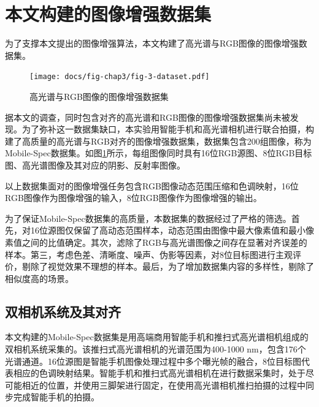 \documentclass[
    type = master, %
    degree = academic,        %
    decl-page,  %
  ]{njuthesis}
\begin{document}
\section{本文构建的图像增强数据集}

为了支撑本文提出的图像增强算法，本文构建了高光谱与RGB图像的图像增强数据集。

\begin{figure}[h]
	\centering
	\texttt{[image: docs/fig-chap3/fig-3-dataset.pdf]}
	\caption{高光谱与RGB图像的图像增强数据集}
	\label{fig:enhance dataset}
\end{figure}
据本文的调查，同时包含对齐的高光谱和RGB图像的图像增强数据集尚未被发现。为了弥补这一数据集缺口，本实验用智能手机和高光谱相机进行联合拍摄，构建了高质量的高光谱与RGB对齐的图像增强数据集，数据集包含200组图像，称为Mobile-Spec数据集。如图\ref{fig:enhance dataset}所示，每组图像同时具有16位RGB源图、8位RGB目标图、高光谱图像及其对应的阴影、反射率图像。

以上数据集面对的图像增强任务包含RGB图像动态范围压缩和色调映射，16位RGB图像作为图像增强的输入，8位RGB图像作为图像增强的输出。


为了保证Mobile-Spec数据集的高质量，本数据集的数据经过了严格的筛选。首先，对16位源图仅保留了高动态范围样本，动态范围由图像中最大像素值和最小像素值之间的比值确定。其次，滤除了RGB与高光谱图像之间存在显著对齐误差的样本。第三，考虑色差、清晰度、噪声、伪影等因素，对8位目标图进行主观评价，剔除了视觉效果不理想的样本。最后，为了增加数据集内容的多样性，剔除了相似度高的场景。


\subsection{双相机系统及其对齐}

本文构建的Mobile-Spec数据集是用高端商用智能手机和推扫式高光谱相机组成的双相机系统采集的。该推扫式高光谱相机的光谱范围为400-1000 nm，包含176个光谱通道。16位源图是智能手机图像处理过程中多个曝光帧的融合，8位目标图代表相应的色调映射结果。智能手机和推扫式高光谱相机在进行数据采集时，处于尽可能相近的位置，并使用三脚架进行固定，在使用高光谱相机推扫拍摄的过程中同步完成智能手机的拍摄。
\end{document}

